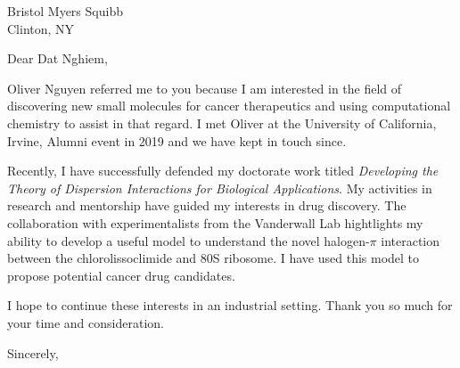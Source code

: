 \documentclass[12pt]{letter}
\begin{document}
\begin{letter}{Bristol Myers Squibb \\ Clinton, NY}

\opening{Dear Dat Nghiem,}

Oliver Nguyen referred me to you because I am interested in the field of discovering new
small molecules for cancer therapeutics and using computational chemistry to assist in
that regard. I met Oliver at the University of California, Irvine,
Alumni event in 2019 and we have kept in touch since.

Recently, I have successfully defended my doctorate work titled \textit{Developing
  the Theory of Dispersion Interactions for Biological Applications}. My activities
in research and mentorship have guided my interests in drug discovery. The collaboration
with experimentalists from the Vanderwall Lab hightlights my ability to develop a
useful model to understand the novel halogen-$\pi$ interaction between the chlorolissoclimide
and 80S ribosome. I have used this model to propose potential cancer drug candidates.

I hope to continue these interests in an industrial setting. Thank you so much for your
time and consideration.

\thispagestyle{uciletter}

\closing{Sincerely,}

\end{letter}
\end{document}
